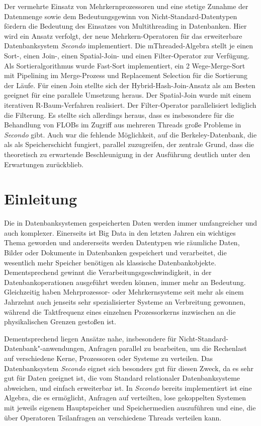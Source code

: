 \documentclass[a4paper,12pt,twoside]{article}
\newcommand{\Fb}[1]{\textit{#1}} %
\begin{document}
Der vermehrte Einsatz von Mehrkernprozessoren und eine stetige Zunahme der Datenmenge sowie dem Bedeutungsgewinn von Nicht-Standard-Datentypen fördern die Bedeutung des Einsatzes von Multithreading in Datenbanken. Hier wird ein Ansatz verfolgt, der neue Mehrkern-Operatoren für das erweiterbare Datenbanksystem \Fb{Secondo} implementiert. Die mThreaded-Algebra stellt je einen Sort-, einen Join-, einen Spatial-Join- und einen Filter-Operator zur Verfügung. Als Sortieralgorithmus wurde Fast-Sort implementiert, ein 2 Wege-Merge-Sort mit Pipelining im Merge-Prozess und Replacement Selection für die Sortierung der Läufe. Für einen Join stellte sich der Hybrid-Hash-Join-Ansatz als am Besten geeignet für eine parallele Umsetzung heraus. Der Spatial-Join wurde mit einem iterativen R-Baum-Verfahren realisiert. Der Filter-Operator parallelisiert lediglich die Filterung. Es stellte sich allerdings heraus, dass es insbesondere für die Behandlung von FLOBs im Zugriff aus mehreren Threads große Probleme in \Fb{Secondo} gibt. Auch war die fehlende Möglichkeit, auf die Berkeley-Datenbank, die als als Speicherschicht fungiert, parallel zuzugreifen, der zentrale Grund, dass die theoretisch zu erwartende Beschleunigung in der Ausführung deutlich unter den Erwartungen zurückblieb.

\clearpage
\tableofcontents
\clearpage
\raggedbottom
\thispagestyle{fancy}
\pagestyle{fancy}
\setcounter{page}{1}

\section{Einleitung}

Die in Datenbanksystemen gespeicherten Daten werden immer umfangreicher und auch komplexer. Einerseits ist Big Data in den letzten Jahren ein wichtiges Thema geworden und andererseits werden Datentypen wie räumliche Daten, Bilder oder Dokumente in Datenbanken gespeichert und verarbeitet, die wesentlich mehr Speicher benötigen als klassische Datenbankobjekte. Dementsprechend gewinnt die Verarbeitungsgeschwindigkeit, in der Datenbankoperationen ausgeführt werden können, immer mehr an Bedeutung. Gleichzeitig haben Mehrprozessor- oder Mehrkernsysteme seit mehr als einem Jahrzehnt auch jenseits sehr spezialisierter Systeme an Verbreitung gewonnen, während die Taktfrequenz eines einzelnen Prozessorkerns inzwischen an die physikalischen Grenzen gestoßen ist.

Dementsprechend liegen Ansätze nahe, insbesondere für Nicht-Standard-Datenbank"-anwendungen, Anfragen parallel zu bearbeiten, um die Rechenlast auf verschiedene Kerne, Prozessoren oder Systeme zu verteilen. Das Datenbanksystem \Fb{Secondo} eignet sich besonders gut für diesen Zweck, da es sehr gut für Daten geeignet ist, die vom Standard relationaler Datenbanksysteme abweichen, und einfach erweiterbar ist. In \Fb{Secondo} bereits implementiert ist eine Algebra, die es ermöglicht, Anfragen auf verteilten, lose gekoppelten Systemen mit jeweils eigenem Hauptspeicher und Speichermedien auszuführen und eine, die über Operatoren Teilanfragen an verschiedene Threads verteilen kann.
\end{document}

